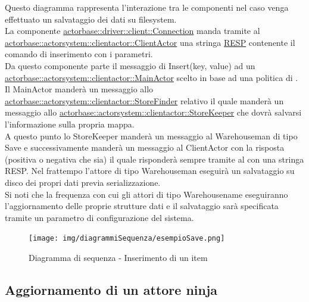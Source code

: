 \documentclass{scalatekids-article}
\begin{document}
Questo diagramma rappresenta l'interazione tra le componenti nel caso venga
effettuato un salvataggio dei dati su filesystem.\\
La componente \hyperref[sec:actorbase::driver::client::Connection]{actorbase::driver::client::Connection}
manda tramite  al \hyperref[sec:actorbase::actorsystem::clientactor::ClientActor]{actorbase::actorsystem::clientactor::ClientActor}
una stringa \hyperref[sec:RESP]{RESP} contenente il comando di inserimento  con
i parametri.\\
Da questo componente parte il messaggio di Insert(key, value) ad un \hyperref[sec:actorbase::actorsystem::clientactor::MainActor]{actorbase::actorsystem::clientactor::MainActor} scelto in base ad una
politica di . Il MainActor manderà un messaggio allo \hyperref[sec:actorbase::actorsystem::clientactor::StoreFinder]{actorbase::actorsystem::clientactor::StoreFinder} relativo il quale manderà un messaggio allo \hyperref[sec:actorbase::actorsystem::clientactor::StoreKeeper]{actorbase::actorsystem::clientactor::StoreKeeper} che dovrà salvarsi l'informazione
sulla propria mappa.\\
A questo punto lo StoreKeeper manderà un messaggio al Warehouseman di tipo Save e
successivamente manderà un messaggio al ClientActor con la risposta
(positiva o negativa che sia) il quale risponderà sempre tramite  al  con una stringa RESP.
Nel frattempo l'attore di tipo Warehouseman eseguirà un salvataggio su disco dei propri dati previa serializzazione.\\
Si noti che la frequenza con cui gli attori di tipo Warehousename eseguiranno
l'aggiornamento delle proprie strutture dati e il salvataggio sarà specificata
tramite un parametro di configurazione del sistema.\\
\begin{figure}[H]
  \begin{center}
    \texttt{[image: img/diagrammiSequenza/esempioSave.png]}
    \caption{Diagramma di sequenza - Inserimento di un item}
  \end{center}
\end{figure}

\subsection{Aggiornamento di un attore ninja}
\end{document}

